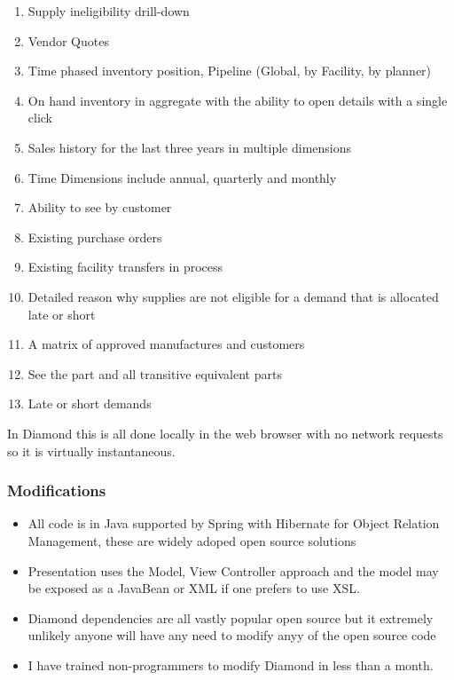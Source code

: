 \documentclass[letterpaper,10pt,english]{sphinxmanual}
\begin{document}
\begin{enumerate}
\item {} 
Supply ineligibility drill-down

\item {} 
Vendor Quotes

\item {} 
Time phased inventory position, Pipeline (Global, by Facility, by
planner)

\item {} 
On hand inventory in aggregate with the ability to open details with
a single click

\item {} 
Sales history for the last three years in multiple dimensions

\item {} 
Time Dimensions include annual, quarterly and monthly

\item {} 
Ability to see by customer

\item {} 
Existing purchase orders

\item {} 
Existing facility transfers in process

\item {} 
Detailed reason why supplies are not eligible for a demand that is
allocated late or short

\item {} 
A matrix of approved manufactures and customers

\item {} 
See the part and all transitive equivalent parts

\item {} 
Late or short demands

\end{enumerate}

In Diamond this is all done locally in the web browser with no network
requests so it is virtually instantaneous.


\subsubsection{Modifications}
\label{\detokenize{FutureState:modifications}}\begin{itemize}
\item {} 
All code is in Java supported by Spring with Hibernate for Object
Relation Management, these are widely adoped open source solutions

\item {} 
Presentation uses the Model, View Controller approach and the model
may be exposed as a JavaBean or XML if one prefers to use XSL.

\item {} 
Diamond dependencies are all vastly popular open source but it
extremely unlikely anyone will have any need to modify anyy of the
open source code

\item {} 
I have trained non-programmers to modify Diamond in less than a
month.

\end{itemize}
\end{document}
